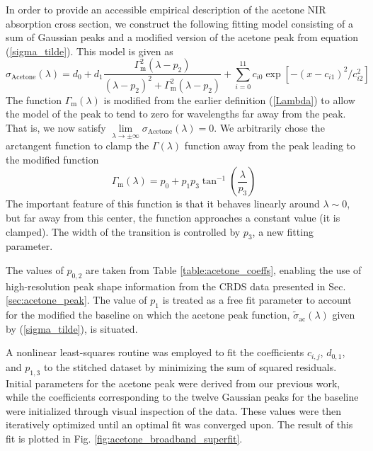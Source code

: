\documentclass[8pt,a4paper]{report}
\begin{document}
	In order to provide an accessible empirical description of the acetone NIR absorption cross section, we construct the following fitting model consisting of a sum of Gaussian peaks and a modified version of the acetone peak from equation (\ref{sigma_tilde}). This model is given as
	\begin{equation} \label{acetone_super_model}
		\sigma_\mathrm{Acetone}(\lambda) = d_0 + d_1\frac{\Gamma_\mathrm{m}^2(\lambda-p_2)}{(\lambda-p_2)^2 + \Gamma_\mathrm{m}^2(\lambda-p_2)} + \sum_{i=0}^{11} c_{i0} \exp \left[-(x-c_{i1})^2/c_{i2}^2\right]
	\end{equation}
	The function $\Gamma_\mathrm{m}(\lambda)$ is modified from the earlier definition (\ref{Lambda}) to allow the model of the peak to tend to zero for wavelengths far away from the peak. That is, we now satisfy $\lim\limits_{\lambda\rightarrow\pm\infty}\sigma_\mathrm{Acetone}(\lambda) = 0$.  We arbitrarily chose the arctangent function to clamp the $\Gamma(\lambda)$ function away from the peak leading to the modified function
	\begin{equation}
		\Gamma_\mathrm{m}(\lambda) = p_0 + p_1 p_3 \tan^{-1}\left(\frac{\lambda}{p_3}\right)
	\end{equation}
	The important feature of this function is that it behaves linearly around $\lambda \sim 0$, but far away from this center, the function approaches a constant value (it is clamped). The width of the transition is controlled by $p_3$, a new fitting parameter.
	
	The values of $p_{0,2}$ are taken from Table \ref{table:acetone_coeffs}, enabling the use of high-resolution peak shape information from the CRDS data presented in Sec. \ref{sec:acetone_peak}. The value of $p_1$ is treated as a free fit parameter to account for the modified the baseline on which the acetone peak function, $\tilde{\sigma}_{\mathrm{ac}}(\lambda)$ given by (\ref{sigma_tilde}), is situated.
	
	A nonlinear least-squares routine was employed to fit the coefficients $c_{i,j}$, $d_{0,1}$, and $p_{1,3}$ to the stitched dataset by minimizing the sum of squared residuals. Initial parameters for the acetone peak were derived from our previous work, while the coefficients corresponding to the twelve Gaussian peaks for the baseline were initialized through visual inspection of the data. These values were then iteratively optimized until an optimal fit was converged upon. The result of this fit is plotted in Fig. \ref{fig:acetone_broadband_superfit}.
	
\end{document}

